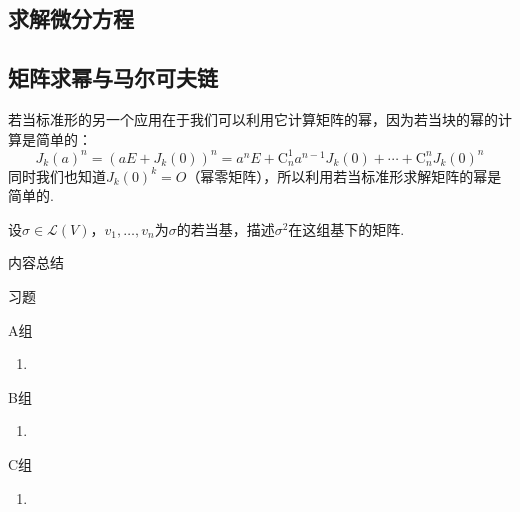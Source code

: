 \subsection{求解微分方程}


\subsection{矩阵求幂与马尔可夫链}
若当标准形的另一个应用在于我们可以利用它计算矩阵的幂，因为若当块的幂的计算是简单的：
\[J_k(a)^n=(aE+J_k(0))^n=a^nE+\mathrm{C}_n^1a^{n-1}J_k(0)+\cdots+\mathrm{C}_n^nJ_k(0)^n\]
同时我们也知道$J_k(0)^k=O$（幂零矩阵），所以利用若当标准形求解矩阵的幂是简单的.
\begin{example}
    设$\sigma\in \mathcal{L}(V)$，$v_1,\ldots,v_n$为$\sigma$的若当基，描述$\sigma^2$在这组基下的矩阵.
\end{example}

\begin{solution}

\end{solution}

\vspace{2ex}
\centerline{\heiti \Large 内容总结}

\vspace{2ex}
\centerline{\heiti \Large 习题}

\vspace{2ex}
{\kaishu }
\begin{flushright}
    \kaishu

\end{flushright}

\centerline{\heiti A组}
\begin{enumerate}
    \item
\end{enumerate}

\centerline{\heiti B组}
\begin{enumerate}
    \item
\end{enumerate}

\centerline{\heiti C组}
\begin{enumerate}
    \item
\end{enumerate}
